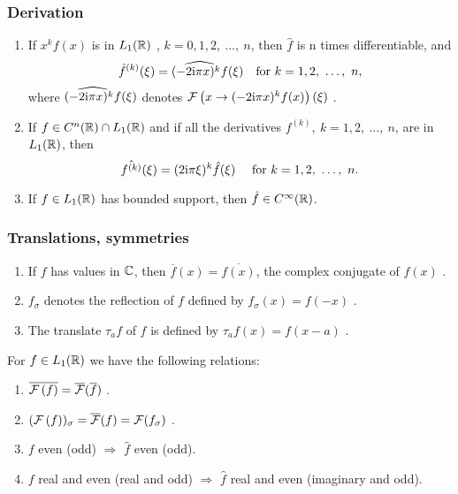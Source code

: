 \begin{frame}
\frametitle{Derivation}

\begin{theorem}
\begin{enumerate}[label=(\roman*)]
\item If $x^{k}f(x)$ is in $L_1(\mathbb{R})$ , $k=0,1,2,\ \ldots,\ n$,  then $\hat{f}$ is n   times differentiable, and
$$
\hat{f}^{(k)}(\xi)=\widehat{(-2\mathrm{i}\pi x)^{k}f}(\xi) \quad  \text{for} \ k=1,2,\ \ldots,\ n,
$$
where $\widehat{(-2 \mathrm{i} \pi x)^{k}f}(\xi)$  denotes $\mathcal{F}\left( x \to (-2\mathrm{i}\pi x)^{k}f(x) \right)(\xi)$ .
\item If $f\in C^{n}(\mathbb{R})\cap L_1(\mathbb{R})$ and if all the derivatives $f^{(k)},\ k=1,2,\ \ldots,\ n$, are  in $L_1(\mathbb{R})$, then
$$
\hat{f^{(k)}}(\xi)=(2\rmi \pi\xi)^{k}\hat{f}(\xi)\ \quad \text{for}\ k=1,2,\ \ldots,\ n.
$$
\item If $f\in L_1(\mathbb{R})$  has bounded support, then $\hat{f}\in C^{\infty}(\mathbb{R})$.
\end{enumerate}
\end{theorem}
\end{frame}

\begin{frame}
\frametitle{Translations, symmetries}
\begin{enumerate}[label=(\roman*)]
\item If $f$ has values in $\mathbb{C}$, then $\overline{f}(x)=\overline{f(x)}$, the complex conjugate of $f(x)$ . 
\item $f_{\sigma}$ denotes the reflection of $f$ defined by $f_{\sigma}(x)=f(-x)$ .
\item The translate $\tau_{a}f$ of $f$ is defined by $\tau_{a}f(x)=f(x-a)$ .
\end{enumerate}
\begin{theorem}
For $f\in L_1(\mathbb{R})$ we have the following relations:
\begin{enumerate}[label=(\roman*)]
\item $\overline{\mathcal{F}\left( f \right)}=\overline{\mathcal{F}}(\overline{f})$ .
\item $(\mathcal{F}\left( f \right))_{\sigma}=\overline{\mathcal{F}}(f)=\mathcal{F} (f_{\sigma})$ .
\item $f$ even (odd) $\Rightarrow$  $\hat{f}$ even (odd).
\item $f$ real and even (real and odd) $\Rightarrow$ $\hat{f}$ real  and even (imaginary and odd).
\end{enumerate}
\end{theorem}
\end{frame}

